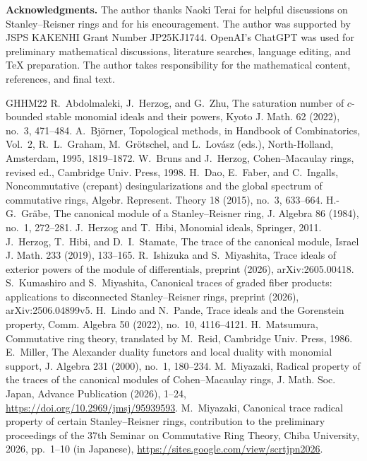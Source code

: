 \documentclass[a4paper,11pt]{amsart}
\theoremstyle{plain}
\theoremstyle{definition}
\theoremstyle{remark}
\begin{document}
\medskip
\noindent\textbf{Acknowledgments.} The author thanks Naoki Terai for helpful discussions on Stanley--Reisner rings and for his encouragement. The author was supported by JSPS KAKENHI Grant Number JP25KJ1744. OpenAI's ChatGPT was used for preliminary mathematical discussions, literature searches, language editing, and \TeX{} preparation. The author takes responsibility for the mathematical content, references, and final text.
\par
\begin{thebibliography}{GHHM22}
 R.~Abdolmaleki, J.~Herzog, and G.~Zhu, The saturation number of $c$-bounded stable monomial ideals and their powers, Kyoto J. Math. 62 (2022), no.~3, 471--484.
 A.~Bj\"orner, Topological methods, in Handbook of Combinatorics, Vol.~2, R.~L.~Graham, M.~Gr\"otschel, and L.~Lov\'asz (eds.), North-Holland, Amsterdam, 1995, 1819--1872.
 W.~Bruns and J.~Herzog, Cohen--Macaulay rings, revised ed., Cambridge Univ. Press, 1998.
 H.~Dao, E.~Faber, and C.~Ingalls, Noncommutative (crepant) desingularizations and the global spectrum of commutative rings, Algebr. Represent. Theory 18 (2015), no.~3, 633--664.
 H.-G.~Gr\"abe, The canonical module of a Stanley--Reisner ring, J. Algebra 86 (1984), no.~1, 272--281.
 J.~Herzog and T.~Hibi, Monomial ideals, Springer, 2011.
 J.~Herzog, T.~Hibi, and D.~I.~Stamate, The trace of the canonical module, Israel J. Math. 233 (2019), 133--165.
 R.~Ishizuka and S.~Miyashita, Trace ideals of exterior powers of the module of differentials, preprint (2026), arXiv:2605.00418.
 S.~Kumashiro and S.~Miyashita, Canonical traces of graded fiber products: applications to disconnected Stanley--Reisner rings, preprint (2026), arXiv:2506.04899v5.
 H.~Lindo and N.~Pande, Trace ideals and the Gorenstein property, Comm. Algebra 50 (2022), no.~10, 4116--4121.
 H.~Matsumura, Commutative ring theory, translated by M.~Reid, Cambridge Univ. Press, 1986.
 E.~Miller, The Alexander duality functors and local duality with monomial support, J. Algebra 231 (2000), no.~1, 180--234.
 M.~Miyazaki, Radical property of the traces of the canonical modules of Cohen--Macaulay rings, J. Math. Soc. Japan, Advance Publication (2026), 1--24, \url{https://doi.org/10.2969/jmsj/95939593}.
 M.~Miyazaki, Canonical trace radical property of certain Stanley--Reisner rings, contribution to the preliminary proceedings of the 37th Seminar on Commutative Ring Theory, Chiba University, 2026, pp.~1--10 (in Japanese), \url{https://sites.google.com/view/scrtjpn2026}.

\end{thebibliography}
\end{document}

